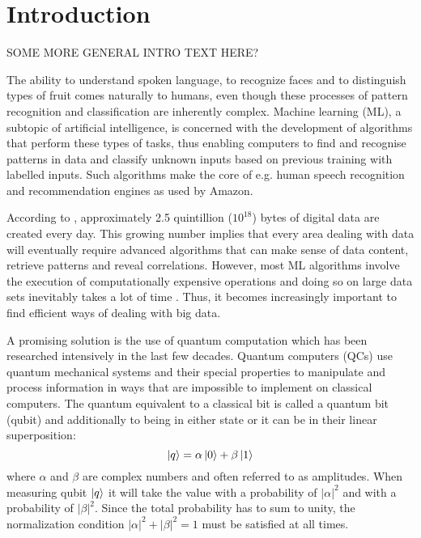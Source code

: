 \chapter{Introduction}\label{sec:introduction}

SOME MORE GENERAL INTRO TEXT HERE?

The ability to understand spoken language, to recognize faces and to distinguish types of fruit comes naturally to humans, even though these processes of pattern recognition and classification are inherently complex. Machine learning (ML), a subtopic of artificial intelligence, is concerned with the development of algorithms that perform these types of tasks, thus enabling computers to find and recognise patterns in data and classify unknown inputs based on previous training with labelled inputs. Such algorithms make the core of e.g. human speech recognition and recommendation engines as used by Amazon.

According to \cite{bigdata}, approximately 2.5 quintillion (${10}^{18}$) bytes of digital data are created every day. This growing number implies that every area dealing with data will eventually require advanced algorithms that can make sense of data content, retrieve patterns and reveal correlations. However, most ML algorithms involve the execution of computationally expensive operations and doing so on large data sets inevitably takes a lot of time \cite{bekkerman2011scaling}. Thus, it becomes increasingly important to find efficient ways of dealing with big data.

A promising solution is the use of quantum computation which has been researched intensively in the last few decades. Quantum computers (QCs) use quantum mechanical systems and their special properties to manipulate and process information in ways that are impossible to implement on classical computers. The quantum equivalent to a classical bit is called a quantum bit (qubit) and additionally to being in either state \0 or \1 it can be in their linear superposition:
\begin{equation}
\label{equ: simplequbit}
\ket{q} = \alpha \ket{0} + \beta \ket{1}
\end{equation}
where $\alpha$ and $\beta$ are complex numbers and often referred to as amplitudes. When measuring qubit $\ket{q}$ it will take the value \0 with a probability of ${|\alpha|}^{2}$ and \1 with a probability of ${|\beta|}^{2}$. Since the total probability has to sum to unity, the normalization condition ${|\alpha|}^{2} + {|\beta|}^{2} =  1$ must be satisfied at all times.

